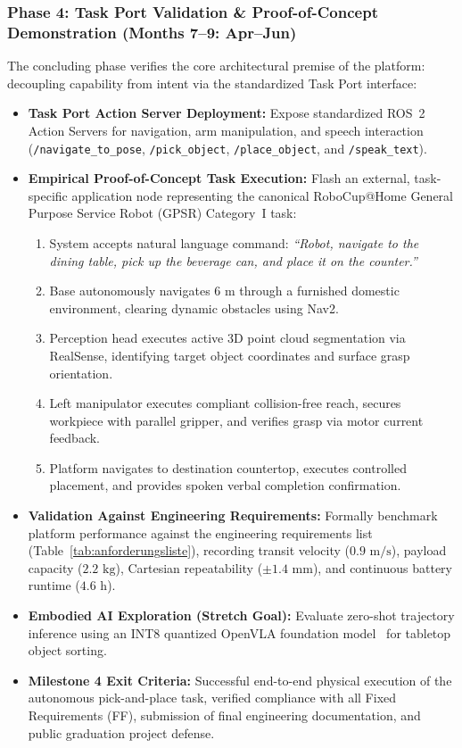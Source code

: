 \subsubsection{Phase 4: Task Port Validation \& Proof-of-Concept Demonstration (Months 7--9: Apr--Jun)}
The concluding phase verifies the core architectural premise of the platform: decoupling capability from intent via the standardized Task Port interface:
\begin{itemize}[leftmargin=1.5em]
  \item \textbf{Task Port Action Server Deployment:} Expose standardized ROS~2 Action Servers for navigation, arm manipulation, and speech interaction (\texttt{/navigate\_to\_pose}, \texttt{/pick\_object}, \texttt{/place\_object}, and \texttt{/speak\_text}).
  \item \textbf{Empirical Proof-of-Concept Task Execution:} Flash an external, task-specific application node representing the canonical RoboCup@Home General Purpose Service Robot (GPSR) Category~I task:
  \begin{enumerate}[leftmargin=1.2em]
    \item System accepts natural language command: \emph{``Robot, navigate to the dining table, pick up the beverage can, and place it on the counter.''}
    \item Base autonomously navigates $6\text{ m}$ through a furnished domestic environment, clearing dynamic obstacles using Nav2.
    \item Perception head executes active 3D point cloud segmentation via RealSense, identifying target object coordinates and surface grasp orientation.
    \item Left manipulator executes compliant collision-free reach, secures workpiece with parallel gripper, and verifies grasp via motor current feedback.
    \item Platform navigates to destination countertop, executes controlled placement, and provides spoken verbal completion confirmation.
  \end{enumerate}
  \item \textbf{Validation Against Engineering Requirements:} Formally benchmark platform performance against the engineering requirements list (Table~\ref{tab:anforderungsliste}), recording transit velocity ($0.9\text{ m/s}$), payload capacity ($2.2\text{ kg}$), Cartesian repeatability ($\pm 1.4\text{ mm}$), and continuous battery runtime ($4.6\text{ h}$).
  \item \textbf{Embodied AI Exploration (Stretch Goal):} Evaluate zero-shot trajectory inference using an INT8 quantized OpenVLA foundation model~\cite{openvla} for tabletop object sorting.
  \item \textbf{Milestone 4 Exit Criteria:} Successful end-to-end physical execution of the autonomous pick-and-place task, verified compliance with all Fixed Requirements (FF), submission of final engineering documentation, and public graduation project defense.
\end{itemize}
